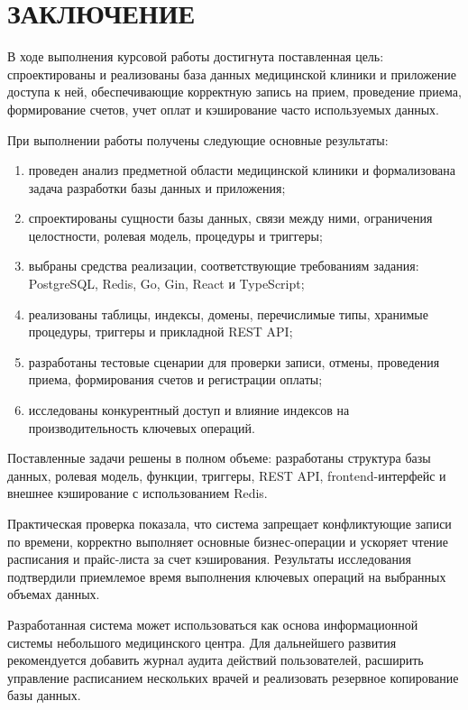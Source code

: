 \chapter*{ЗАКЛЮЧЕНИЕ}

В ходе выполнения курсовой работы достигнута поставленная цель: спроектированы и реализованы база данных медицинской клиники и приложение доступа к ней, обеспечивающие корректную запись на прием, проведение приема, формирование счетов, учет оплат и кэширование часто используемых данных.

При выполнении работы получены следующие основные результаты:
\begin{enumerate}
    \item проведен анализ предметной области медицинской клиники и формализована задача разработки базы данных и приложения;
    \item спроектированы сущности базы данных, связи между ними, ограничения целостности, ролевая модель, процедуры и триггеры;
    \item выбраны средства реализации, соответствующие требованиям задания: PostgreSQL, Redis, Go, Gin, React и TypeScript;
    \item реализованы таблицы, индексы, домены, перечислимые типы, хранимые процедуры, триггеры и прикладной REST API;
    \item разработаны тестовые сценарии для проверки записи, отмены, проведения приема, формирования счетов и регистрации оплаты;
    \item исследованы конкурентный доступ и влияние индексов на производительность ключевых операций.
\end{enumerate}

Поставленные задачи решены в полном объеме: разработаны структура базы данных, ролевая модель, функции, триггеры, REST API, frontend-интерфейс и внешнее кэширование с использованием Redis.

Практическая проверка показала, что система запрещает конфликтующие записи по времени, корректно выполняет основные бизнес-операции и ускоряет чтение расписания и прайс-листа за счет кэширования. Результаты исследования подтвердили приемлемое время выполнения ключевых операций на выбранных объемах данных.

Разработанная система может использоваться как основа информационной системы небольшого медицинского центра. Для дальнейшего развития рекомендуется добавить журнал аудита действий пользователей, расширить управление расписанием нескольких врачей и реализовать резервное копирование базы данных.

\clearpage
